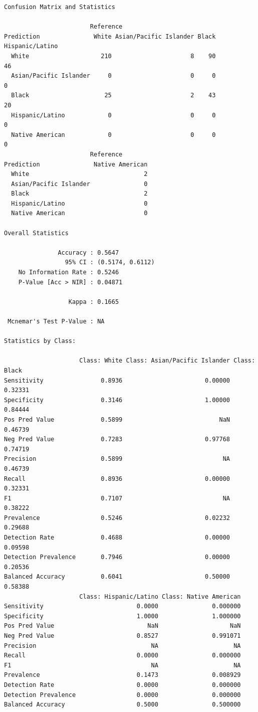 \documentclass[
  letterpaper,
  DIV=11,
  numbers=noendperiod]{scrartcl}
\begin{document}
\begin{verbatim}
Confusion Matrix and Statistics

                        Reference
Prediction               White Asian/Pacific Islander Black Hispanic/Latino
  White                    210                      8    90              46
  Asian/Pacific Islander     0                      0     0               0
  Black                     25                      2    43              20
  Hispanic/Latino            0                      0     0               0
  Native American            0                      0     0               0
                        Reference
Prediction               Native American
  White                                2
  Asian/Pacific Islander               0
  Black                                2
  Hispanic/Latino                      0
  Native American                      0

Overall Statistics
                                          
               Accuracy : 0.5647          
                 95% CI : (0.5174, 0.6112)
    No Information Rate : 0.5246          
    P-Value [Acc > NIR] : 0.04871         
                                          
                  Kappa : 0.1665          
                                          
 Mcnemar's Test P-Value : NA              

Statistics by Class:

                     Class: White Class: Asian/Pacific Islander Class: Black
Sensitivity                0.8936                       0.00000      0.32331
Specificity                0.3146                       1.00000      0.84444
Pos Pred Value             0.5899                           NaN      0.46739
Neg Pred Value             0.7283                       0.97768      0.74719
Precision                  0.5899                            NA      0.46739
Recall                     0.8936                       0.00000      0.32331
F1                         0.7107                            NA      0.38222
Prevalence                 0.5246                       0.02232      0.29688
Detection Rate             0.4688                       0.00000      0.09598
Detection Prevalence       0.7946                       0.00000      0.20536
Balanced Accuracy          0.6041                       0.50000      0.58388
                     Class: Hispanic/Latino Class: Native American
Sensitivity                          0.0000               0.000000
Specificity                          1.0000               1.000000
Pos Pred Value                          NaN                    NaN
Neg Pred Value                       0.8527               0.991071
Precision                                NA                     NA
Recall                               0.0000               0.000000
F1                                       NA                     NA
Prevalence                           0.1473               0.008929
Detection Rate                       0.0000               0.000000
Detection Prevalence                 0.0000               0.000000
Balanced Accuracy                    0.5000               0.500000
\end{verbatim}
\end{document}
